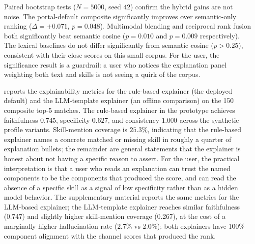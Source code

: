 Paired bootstrap tests ($N{=}5000$, seed $42$) confirm the hybrid gains are not noise.
The portal-default composite significantly improves \ndcg{} over semantic-only ranking ($\Delta = +0.071$, $p = 0.048$).
Multimodal blending and reciprocal rank fusion both significantly beat semantic cosine ($p = 0.010$ and $p = 0.009$ respectively).
The lexical baselines do not differ significantly from semantic cosine ($p > 0.25$), consistent with their close scores on this small corpus.
For the user, the significance result is a guardrail: a user who notices the explanation panel weighting both text and skills is not seeing a quirk of the corpus.

 reports the explainability metrics for the rule-based explainer (the deployed default) and the LLM-template explainer (an offline comparison) on the 150 composite top-5 matches.
The rule-based explainer in the prototype achieves faithfulness $0.745$, specificity $0.627$, and consistency $1.000$ across the synthetic profile variants.
Skill-mention coverage is $25.3\%$, indicating that the rule-based explainer names a concrete matched or missing skill in roughly a quarter of explanation bullets; the remainder are general statements that the explainer is honest about not having a specific reason to assert.
For the user, the practical interpretation is that a user who reads an explanation can trust the named components to be the components that produced the score, and can read the absence of a specific skill as a signal of low specificity rather than as a hidden model behavior.
The supplementary material reports the same metrics for the LLM-based explainer; the LLM-template explainer reaches similar faithfulness (0.747) and slightly higher skill-mention coverage (0.267), at the cost of a marginally higher hallucination rate (2.7\% vs 2.0\%); both explainers have 100\% component alignment with the channel scores that produced the rank.

